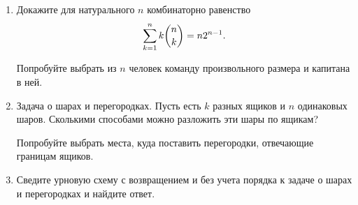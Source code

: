\begin{enumerate}
    \item Докажите для натурального $n$ комбинаторно равенство
        \[
            \sum\limits_{k=1}^n k\binom{n}{k} = n2^{n-1}.
            \]
        \begin{hint}
            Попробуйте выбрать из $n$ человек команду произвольного
            размера и капитана в ней.
        \end{hint}

    \item Задача о шарах и перегородках. Пусть есть $k$ разных ящиков 
        и $n$ одинаковых шаров. Сколькими способами можно разложить 
        эти шары по ящикам?
        \begin{hint}
            Попробуйте выбрать места, куда поставить перегородки,
            отвечающие границам ящиков.
        \end{hint}

    \item Сведите урновую схему с возвращением и без учета порядка
        к задаче о шарах и перегородках и найдите ответ.
\end{enumerate}
